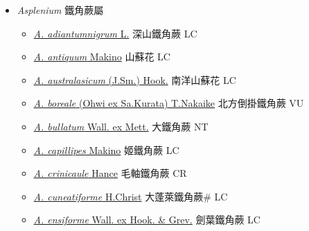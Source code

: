 
  \begin{itemize}
 \item[] \textit{Asplenium} 鐵角蕨屬
                    
  \begin{itemize}
        \item[] \href{http://www.theplantlist.org/tpl1.1/search?q=Asplenium+adiantumnigrum}{\textit{A. adiantumnigrum} L.}   深山鐵角蕨 LC
        \item[] \href{http://www.theplantlist.org/tpl1.1/search?q=Asplenium+antiquum}{\textit{A. antiquum} Makino}   山蘇花 LC
        \item[] \href{http://www.theplantlist.org/tpl1.1/search?q=Asplenium+australasicum}{\textit{A. australasicum} (J.Sm.) Hook.}   南洋山蘇花 LC
        \item[] \href{http://www.theplantlist.org/tpl1.1/search?q=Asplenium+boreale}{\textit{A. boreale} (Ohwi ex Sa.Kurata) T.Nakaike}   北方倒掛鐵角蕨 VU
        \item[] \href{http://www.theplantlist.org/tpl1.1/search?q=Asplenium+bullatum}{\textit{A. bullatum} Wall. ex Mett.}   大鐵角蕨 NT
        \item[] \href{http://www.theplantlist.org/tpl1.1/search?q=Asplenium+capillipes}{\textit{A. capillipes} Makino}   姬鐵角蕨 LC
        \item[] \href{http://www.theplantlist.org/tpl1.1/search?q=Asplenium+crinicaule}{\textit{A. crinicaule} Hance}   毛軸鐵角蕨 CR
        \item[] \href{http://www.theplantlist.org/tpl1.1/search?q=Asplenium+cuneatiforme}{\textit{A. cuneatiforme} H.Christ}   大蓬萊鐵角蕨\# LC
        \item[] \href{http://www.theplantlist.org/tpl1.1/search?q=Asplenium+ensiforme}{\textit{A. ensiforme} Wall. ex Hook. \& Grev.}   劍葉鐵角蕨 LC

\end{itemize}
\end{itemize}
